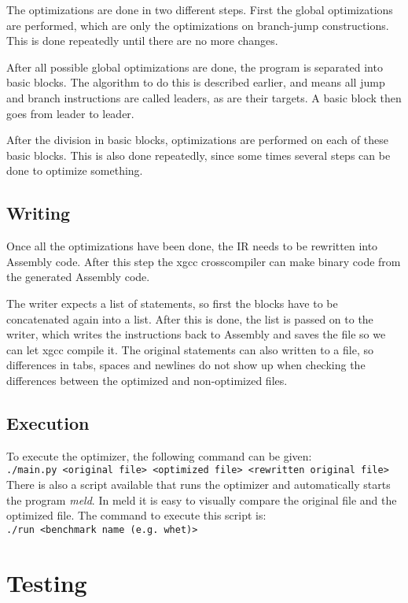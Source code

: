 \documentclass[10pt,a4paper]{article}
\begin{document}
The optimizations are done in two different steps. First the global
optimizations are performed, which are only the optimizations on branch-jump
constructions. This is done repeatedly until there are no more changes.

After all possible global optimizations are done, the program is separated into
basic blocks. The algorithm to do this is described earlier, and means all
jump and branch instructions are called leaders, as are their targets. A basic
block then goes from leader to leader.

After the division in basic blocks, optimizations are performed on each of
these basic blocks. This is also done repeatedly, since some times several
steps can be done to optimize something.

\subsection{Writing}

Once all the optimizations have been done, the IR needs to be rewritten into
Assembly code. After this step the xgcc crosscompiler can make binary code from
the generated Assembly code.

The writer expects a list of statements, so first the blocks have to be
concatenated again into a list. After this is done, the list is passed on to
the writer, which writes the instructions back to Assembly and saves the file
so we can let xgcc compile it. The original statements can also written to a
file, so differences in tabs, spaces and newlines do not show up when checking
the differences between the optimized and non-optimized files.

\subsection{Execution}

To execute the optimizer, the following command can be given:\\
\texttt{./main.py <original file> <optimized file> <rewritten original file>}\\
There is also a script available that runs the optimizer and automatically
starts the program \emph{meld}. In meld it is easy to visually compare the
original file and the optimized file. The command to execute this script is:\\
\texttt{./run <benchmark name (e.g. whet)>}\\

\section{Testing}
\end{document}
